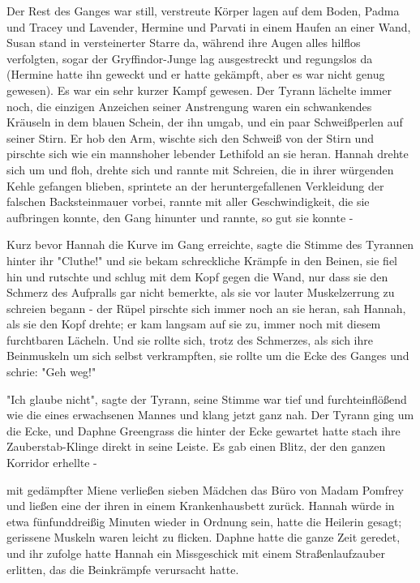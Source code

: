 {Der Rest des Ganges war still, verstreute Körper lagen auf dem Boden, Padma und Tracey und Lavender, Hermine und Parvati in einem Haufen an einer Wand, Susan stand in versteinerter Starre da, während ihre Augen alles hilflos verfolgten, sogar der Gryffindor-Junge lag ausgestreckt und regungslos da (Hermine hatte ihn geweckt und er hatte gekämpft, aber es war nicht genug gewesen). Es war ein sehr kurzer Kampf gewesen. Der Tyrann lächelte immer noch, die einzigen Anzeichen seiner Anstrengung waren ein schwankendes Kräuseln in dem blauen Schein, der ihn umgab, und ein paar Schweißperlen auf seiner Stirn. Er hob den Arm, wischte sich den Schweiß von der Stirn und pirschte sich wie ein mannshoher lebender Lethifold an sie heran. Hannah drehte sich um und floh, drehte sich und rannte mit Schreien, die in ihrer würgenden Kehle gefangen blieben, sprintete an der heruntergefallenen Verkleidung der falschen Backsteinmauer vorbei, rannte mit aller Geschwindigkeit, die sie aufbringen konnte, den Gang hinunter und rannte, so gut sie konnte -

Kurz bevor Hannah die Kurve im Gang erreichte, sagte die Stimme des Tyrannen hinter ihr "Cluthe!" und sie bekam schreckliche Krämpfe in den Beinen, sie fiel hin und rutschte und schlug mit dem Kopf gegen die Wand, nur dass sie den Schmerz des Aufpralls gar nicht bemerkte, als sie vor lauter Muskelzerrung zu schreien begann - der Rüpel pirschte sich immer noch an sie heran, sah Hannah, als sie den Kopf drehte; er kam langsam auf sie zu, immer noch mit diesem furchtbaren Lächeln. Und sie rollte sich, trotz des Schmerzes, als sich ihre Beinmuskeln um sich selbst verkrampften, sie rollte um die Ecke des Ganges und schrie: "Geh weg!"

"Ich glaube nicht", sagte der Tyrann, seine Stimme war tief und furchteinflößend wie die eines erwachsenen Mannes und klang jetzt ganz nah. Der Tyrann ging um die Ecke, und Daphne Greengrass die hinter der Ecke gewartet hatte stach ihre Zauberstab-Klinge direkt in seine Leiste. Es gab einen Blitz, der den ganzen Korridor erhellte -

mit gedämpfter Miene verließen sieben Mädchen das Büro von Madam Pomfrey und ließen eine der ihren in einem Krankenhausbett zurück. Hannah würde in etwa fünfunddreißig Minuten wieder in Ordnung sein, hatte die Heilerin gesagt; gerissene Muskeln waren leicht zu flicken. Daphne hatte die ganze Zeit geredet, und ihr zufolge hatte Hannah ein Missgeschick mit einem Straßenlaufzauber erlitten, das die Beinkrämpfe verursacht hatte.

}
